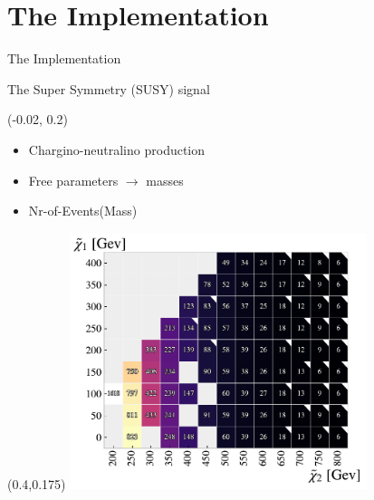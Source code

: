 \documentclass[UKenglish]{beamer}
\begin{document}
   

\section{The Implementation}
\begin{frame}{The Implementation}
    \tableofcontents[currentsection]
\end{frame}

\begin{frame}{The Super Symmetry (SUSY) signal}
    \begin{textblock}{0.4}(-0.02, 0.2)
        \begin{itemize}
            \item Chargino-neutralino production
            \item Free parameters $\rightarrow$ masses 
            \item Nr-of-Events(Mass)
        \end{itemize}
    \end{textblock}
    \begin{textblock}{.9}(0.4,0.175)
        \includegraphics[width=0.65\textwidth]{figures/Signal/NrSignalEvents.pdf}
    \end{textblock}
\end{frame}
\end{document}
